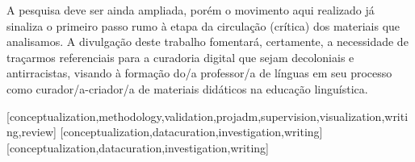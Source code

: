 \documentclass[portuguese]{textolivre}
\begin{document}
A pesquisa deve ser ainda ampliada, porém o movimento aqui realizado já sinaliza o primeiro passo rumo à etapa da circulação (crítica) dos materiais que analisamos. A divulgação deste trabalho fomentará, certamente, a necessidade de traçarmos referenciais para a curadoria digital que sejam decoloniais e antirracistas, visando à formação do/a professor/a de línguas em seu processo como curador/a-criador/a de materiais didáticos na educação linguística.

\printbibliography\label{sec-bib}


\begin{contributors}
	[conceptualization,methodology,validation,projadm,supervision,visualization,writing,review]
	[conceptualization,datacuration,investigation,writing]
	[conceptualization,datacuration,investigation,writing]
\end{contributors}
\end{document}

